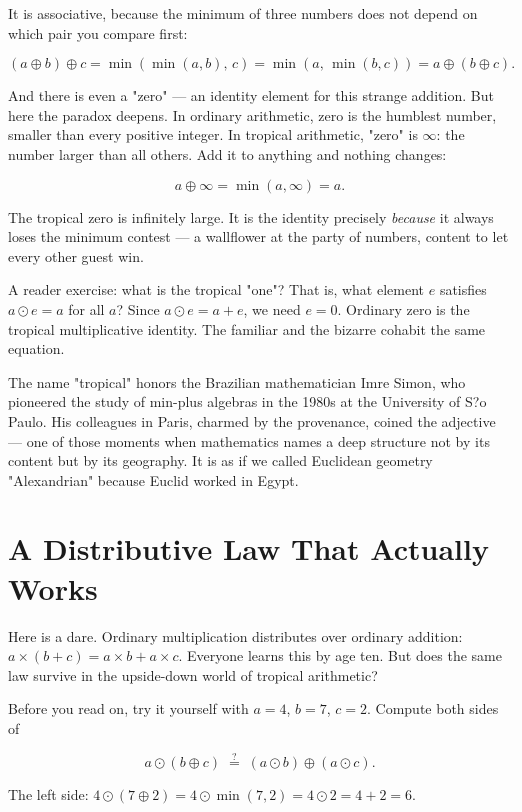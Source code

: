 It is associative, because the minimum of three numbers does not depend on which pair you compare first:

\[
(a \oplus b) \oplus c = \min(\min(a,b),\, c) = \min(a,\, \min(b,c)) = a \oplus (b \oplus c).
\]

And there is even a "zero" --- an identity element for this strange addition. But here the paradox deepens. In ordinary arithmetic, zero is the humblest number, smaller than every positive integer. In tropical arithmetic, "zero" is $\infty$: the number larger than all others. Add it to anything and nothing changes:

\[
a \oplus \infty = \min(a, \infty) = a.
\]

The tropical zero is infinitely large. It is the identity precisely \textit{because} it always loses the minimum contest --- a wallflower at the party of numbers, content to let every other guest win.

A reader exercise: what is the tropical "one"? That is, what element $e$ satisfies $a \odot e = a$ for all $a$? Since $a \odot e = a + e$, we need $e = 0$. Ordinary zero is the tropical multiplicative identity. The familiar and the bizarre cohabit the same equation.

The name "tropical" honors the Brazilian mathematician Imre Simon, who pioneered the study of min-plus algebras in the 1980s at the University of S?o Paulo. His colleagues in Paris, charmed by the provenance, coined the adjective --- one of those moments when mathematics names a deep structure not by its content but by its geography. It is as if we called Euclidean geometry "Alexandrian" because Euclid worked in Egypt.


\bigskip


\section{A Distributive Law That Actually Works}

Here is a dare. Ordinary multiplication distributes over ordinary addition: $a \times (b + c) = a \times b + a \times c$. Everyone learns this by age ten. But does the same law survive in the upside-down world of tropical arithmetic?

Before you read on, try it yourself with $a = 4$, $b = 7$, $c = 2$. Compute both sides of

\[
a \odot (b \oplus c) \;\stackrel{?}{=}\; (a \odot b) \oplus (a \odot c).
\]

The left side: $4 \odot (7 \oplus 2) = 4 \odot \min(7,2) = 4 \odot 2 = 4 + 2 = 6$.

